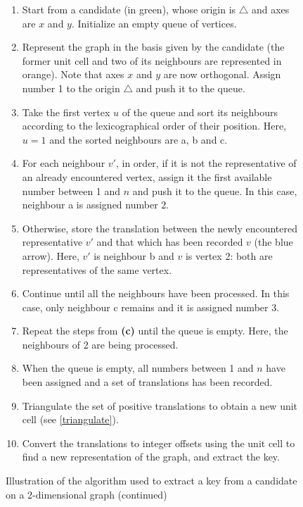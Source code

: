 \documentclass[main.tex]{subfiles}
\begin{document}
\begin{figure}\ContinuedFloat
	\begin{fminipage}{\linewidth}
	\begin{enumerate}[label={\sffamily\small\bfseries(\alph*)},itemsep=0em]
		\item Start from a candidate (in {\color{green!50!black}green}), whose origin is $\boldsymbol\triangle$ and axes are $x$ and $y$. Initialize an empty queue of vertices.
		\item Represent the graph in the basis given by the candidate (the former unit cell and two of its neighbours are represented in {\color{orange}orange}). Note that axes $x$ and $y$ are now orthogonal. Assign number 1 to the origin $\boldsymbol\triangle$ and push it to the queue.
		\item Take the first vertex $u$ of the queue and sort its neighbours according to the lexicographical order of their position. Here, $u = 1$ and the sorted neighbours are a, b and c.
		\item For each neighbour $v'$, in order, if it is not the representative of an already encountered vertex, assign it the first available number between 1 and $n$ and push it to the queue. In this case, neighbour a is assigned number 2.
		\item Otherwise, store the translation between the newly encountered representative $v'$ and that which has been recorded $v$ (the {\color{blue}blue} arrow). Here, $v'$ is neighbour b and $v$ is vertex 2: both are representatives of the same vertex.
		\item Continue until all the neighbours have been processed. In this case, only neighbour c remains and it is assigned number 3.
		\item Repeat the steps from {\sffamily\small\bfseries(c)} until the queue is empty. Here, the neighbours of 2 are being processed.
		\item When the queue is empty, all numbers between 1 and $n$ have been assigned and a set of translations has been recorded.
		\item Triangulate the set of positive translations to obtain a new unit cell (see \cref{triangulate}).
		\item Convert the translations to integer offsets using the unit cell to find a new representation of the graph, and extract the key.
	\end{enumerate}
	\vspace{8mm}
	
	\caption{Illustration of the algorithm used to extract a key from a candidate on a 2-dimensional graph (continued)} \label{algocandidate}
	\end{fminipage}
\end{figure}
\end{document}
